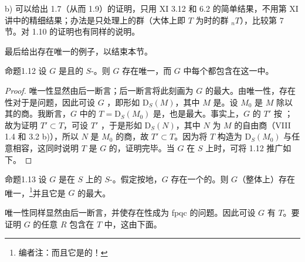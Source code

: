  b) 可以给出 1.7（从而 1.9）的证明，只用 XI 3.12 和 6.2 的简单结果，不用第 XI 讲中的精细结果；办法是只处理上的群（大体上即 $T$ 为时的群 ${}_nT$），比较第 7 节。对 1.10 的证明也有同样的说明。

最后给出存在唯一的例子，以结束本节。
\begin{SGAresult}{命题}{1.12}
设 $G$ 是且的 $S$-。则 $G$ 存在唯一，而 $G$ 中每个都包含在这一中。
\end{SGAresult}
\begin{proof}
唯一性显然由后一断言；后一断言将此刻画为 $G$ 的最大。由唯一性，存在性对于是问题，因此可设 $G$ ，即形如 $\mathrm D_S(M)$，其中 $M$ 是。设 $M_0$ 是 $M$ 除以其的商。我断言，$G$ 中的 $T=\mathrm D_S(M_0)$ 是，也是最大。事实上，$G$ 的 $T'$ 按 ；故为证明 $T'\subset T$，可设 $T'$ ，于是形如 $\mathrm D_S(N)$，其中 $N$ 为 $M$ 的自由商（VIII 1.4 和 3.2 b)），所以 $N$ 是 $M_0$ 的商，故 $T'\subset T$。因为将 $T$ 构造为 $\mathrm D_S(M_0)$ 与任意相容，这同时说明 $T$ 是 $G$ 的，证明完毕。当 $G$ 在 $S$ 上时，可将 1.12 推广如下。
\end{proof}
\begin{SGAresult}{命题}{1.13}
设 $G$ 是在 $S$ 上的 $S$-。假定按地，$G$ 存在一个的。则 $G$（整体上）存在唯一，\footnote[5]{编者注：而且它是的！}并且它是 $G$ 的最大。
\end{SGAresult}
唯一性同样显然由后一断言，并使存在性成为 fpqc 的问题。因此可设 $G$ 有 $T$。要证明 $G$ 的任意 $R$ 包含在 $T$ 中，这由下面。
